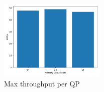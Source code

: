 \begin{figure}[t]
    \includegraphics[width=0.45\textwidth]{fig/qp_bottleneck.pdf}
    \caption{Max throughput per QP }
    \label{fig:qp_bottleneck}
\end{figure}








